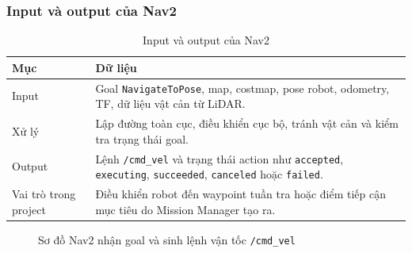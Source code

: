 \subsubsection{Input và output của Nav2}
\label{subsubsec:nav2-io}

\begin{table}[H]
    \centering
    \caption{Input và output của Nav2}
    \label{tab:nav2-io}
    \renewcommand{\arraystretch}{1.25}
    \small
    \begin{tabularx}{\textwidth}{|>{\raggedright\arraybackslash}p{}|>{\raggedright\arraybackslash}X|}
        \hline
        \textbf{Mục} & \textbf{Dữ liệu} \\
        \hline
        Input & Goal \texttt{NavigateToPose}, map, costmap, pose robot, odometry, TF, dữ liệu vật cản từ LiDAR. \\
        \hline
        Xử lý & Lập đường toàn cục, điều khiển cục bộ, tránh vật cản và kiểm tra trạng thái goal. \\
        \hline
        Output & Lệnh \texttt{/cmd\_vel} và trạng thái action như \texttt{accepted}, \texttt{executing}, \texttt{succeeded}, \texttt{canceled} hoặc \texttt{failed}. \\
        \hline
        Vai trò trong project & Điều khiển robot đến waypoint tuần tra hoặc điểm tiếp cận mục tiêu do Mission Manager tạo ra. \\
        \hline
    \end{tabularx}
\end{table}

\begin{figure}[H]
\centering
{}
\caption{Sơ đồ Nav2 nhận goal và sinh lệnh vận tốc \texttt{/cmd\_vel}}
\label{fig:nav2-goal-to-cmdvel}
\end{figure}


